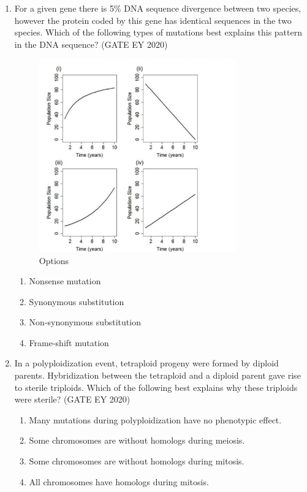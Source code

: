 \begin{enumerate}
\item
For a given gene there is 5\% DNA sequence divergence between two species, however the protein coded by this gene has identical sequences in the two species. Which of the following types of mutations best explains this pattern in the DNA sequence? \hfill {(GATE EY 2020)}

\begin{figure}[H]
\centering
    \includegraphics[width=0.8\textwidth]{figs/fig10.png}
\caption{Options}
\label{fig:q43}
\end{figure}

\begin{multicols}{2}
\begin{enumerate}
\item Nonsense mutation
\item Synonymous substitution
\item Non-synonymous substitution
\item Frame-shift mutation
\end{enumerate}
\end{multicols}

\item
In a polyploidization event, tetraploid progeny were formed by diploid parents. Hybridization between the tetraploid and a diploid parent gave rise to sterile triploids. Which of the following best explains why these triploids were sterile? \hfill {(GATE EY 2020)}
\begin{multicols}{2}
\begin{enumerate}
\item Many mutations during polyploidization have no phenotypic effect.
\item Some chromosomes are without homologs during meiosis.
\item Some chromosomes are without homologs during mitosis.
\item All chromosomes have homologs during mitosis.
\end{enumerate}
\end{multicols}


\end{enumerate}
